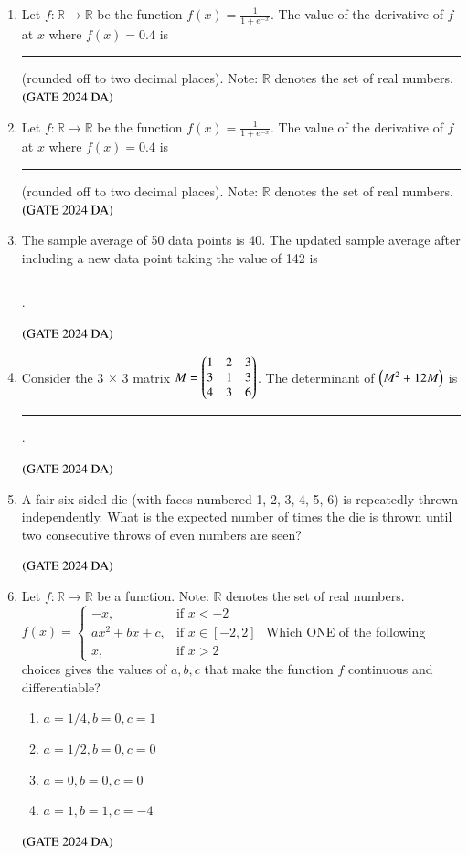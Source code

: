 \documentclass[journal,12pt,onecolumn]{IEEEtran}
\theoremstyle{remark}
\begin{document}
\begin{enumerate}[resume]
\item Let $f: \mathbb{R} \to \mathbb{R}$ be the function $f(x) = \frac{1}{1+e^{-x}}$.
The value of the derivative of $f$ at $x$ where $f(x) = 0.4$ is  \rule{2cm}{0.5mm} (rounded off to two decimal places).
Note: $\mathbb{R}$ denotes the set of real numbers.
\hfill $\left(\text{GATE 2024 DA}\right)$


\item Let $f: \mathbb{R} \to \mathbb{R}$ be the function $f(x) = \frac{1}{1+e^{-x}}$.
The value of the derivative of $f$ at $x$ where $f(x) = 0.4$ is  \rule{2cm}{0.5mm} (rounded off to two decimal places).
Note: $\mathbb{R}$ denotes the set of real numbers.
\hfill $\left(\text{GATE 2024 DA}\right)$


\item The sample average of 50 data points is 40. The updated sample average after including a new data point taking the value of 142 is  \rule{2cm}{0.5mm}.

\hfill $\left(\text{GATE 2024 DA}\right)$


\item Consider the 3 $\times$ 3 matrix $M = \begin{pmatrix} 1 & 2 & 3 \\ 3 & 1 & 3 \\ 4 & 3 & 6\end{pmatrix}$.
The determinant of $\left(M^2 + 12M\right)$ is  \rule{2cm}{0.5mm}.

\hfill $\left(\text{GATE 2024 DA}\right)$


\item A fair six-sided die (with faces numbered 1, 2, 3, 4, 5, 6) is repeatedly thrown independently. What is the expected number of times the die is thrown until two consecutive throws of even numbers are seen?
\begin{enumerate}
\end{enumerate}
\hfill $\left(\text{GATE 2024 DA}\right)$


\item Let $f: \mathbb{R} \to \mathbb{R}$ be a function. Note: $\mathbb{R}$ denotes the set of real numbers.
$f(x) = \begin{cases} -x, & \text{if } x < -2 \\ ax^2 + bx + c, & \text{if } x \in [-2,2] \\ x, & \text{if } x > 2 \end{cases}$
Which ONE of the following choices gives the values of $a, b, c$ that make the function $f$ continuous and differentiable?
\begin{enumerate}
\item $a = 1/4, b = 0, c = 1$
\item $a = 1/2, b = 0, c = 0$
\item $a = 0, b = 0, c = 0$
\item $a = 1, b = 1, c = -4$
\end{enumerate}
\hfill $\left(\text{GATE 2024 DA}\right)$



\end{enumerate}
\end{document}

